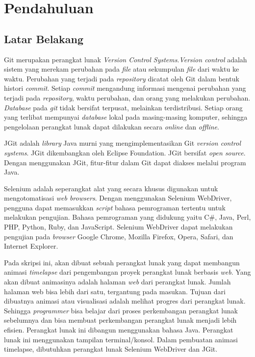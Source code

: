 \chapter{Pendahuluan}
\label{chap:intro}
   
\section{Latar Belakang}
\label{sec:label}
Git merupakan perangkat lunak \textit{Version Control Systems}\cite{chacon2014pro}.\textit{Version control} adalah sistem yang merekam perubahan pada \textit{file} atau sekumpulan \textit{file} dari waktu ke waktu. Perubahan yang terjadi pada \textit{repository} dicatat oleh Git dalam bentuk histori \textit{commit}. Setiap \textit{commit} mengandung informasi mengenai perubahan yang terjadi pada \textit{repository}, waktu perubahan, dan orang yang melakukan perubahan. \textit{Database} pada \textit{git} tidak bersifat terpusat, melainkan terdistribusi. Setiap orang yang terlibat mempunyai \textit{database} lokal pada masing-masing komputer, sehingga pengelolaan perangkat lunak dapat dilakukan secara \textit{online} dan \textit{offline}.

JGit adalah \textit{library} Java murni yang mengimplementasikan Git \textit{version control systems}\cite{JGit}. JGit dikembangkan oleh Eclipse Foundation. JGit bersifat \textit{open source}. Dengan menggunakan JGit, fitur-fitur dalam Git dapat diakses melalui program Java. 

Selenium adalah seperangkat alat yang secara khusus digunakan untuk mengotomatisasi \textit{web browsers}\cite{Selenium}. Dengan menggunakan Selenium WebDriver, pengguna dapat memasukkan \textit{script} bahasa pemrograman tertentu untuk melakukan pengujian. Bahasa pemrograman yang didukung yaitu C\#, Java, Perl, PHP, Python, Ruby, dan JavaScript. Selenium WebDriver dapat melakukan pengujian pada \textit{browser} Google Chrome, Mozilla Firefox, Opera, Safari, dan Internet Explorer.  
  
Pada skripsi ini, akan dibuat sebuah perangkat lunak yang dapat membangun animasi \textit{timelapse} dari pengembangan proyek perangkat lunak berbasis \textit{web}. Yang akan dibuat animasinya adalah halaman \textit{web} dari perangkat lunak. Jumlah halaman web bisa lebih dari satu, tergantung pada masukan. Tujuan dari dibuatnya animasi atau visualisasi adalah melihat progres dari perangkat lunak. Sehingga \textit{programmer} bisa belajar dari proses perkembangan perangkat lunak sebelumnya dan bisa membuat perkembangan perangkat lunak menjadi lebih efisien. Perangkat lunak ini dibangun menggunakan bahasa Java. Perangkat lunak ini menggunakan tampilan terminal/konsol. Dalam pembuatan animasi timelapse, dibutuhkan perangkat lunak Selenium WebDriver dan JGit.

